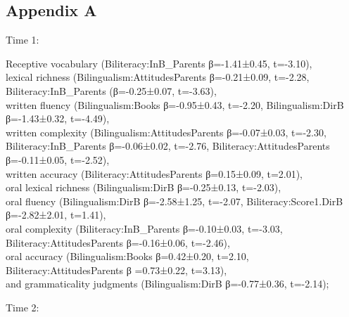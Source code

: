\documentclass[output=paper,modfonts,nonflat,newtxmath]{langsci/langscibook}
\begin{document}
\begin{paperappendix}
\section*{Appendix A}

Time 1:


Receptive vocabulary (Biliteracy:InB\_Parents β=-1.41±0.45, t=-3.10),\\
 lexical richness (Bilingualism:AttitudesParents β=-0.21±0.09, t=-2.28, Biliteracy:InB\_Parents (β=-0.25±0.07, t=-3.63),\\
 written fluency (Bilingualism:Books β=-0.95±0.43, t=-2.20, Bilingualism:DirB β=-1.43±0.32, t=-4.49),\\
 written complexity (Bilingualism:AttitudesParents β=-0.07±0.03, t=-2.30, Biliteracy:InB\_Parents β=-0.06±0.02, t=-2.76, Biliteracy:AttitudesParents β=-0.11±0.05, t=-2.52),\\
 written accuracy (Biliteracy:AttitudesParents β=0.15±0.09, t=2.01),\\
 oral lexical richness (Bilingualism:DirB β=-0.25±0.13, t=-2.03),\\
 oral fluency (Bilingualism:DirB β=-2.58±1.25, t=-2.07, Biliteracy:Score1.DirB β=-2.82±2.01, t=1.41),\\
 oral complexity (Biliteracy:InB\_Parents β=-0.10±0.03, t=-3.03, Biliteracy:AttitudesParents β=-0.16±0.06, t=-2.46),\\
 oral accuracy (Bilingualism:Books β=0.42±0.20, t=2.10, Biliteracy:AttitudesParents β =0.73±0.22, t=3.13),\\
 and grammaticality judgments (Bilingualism:DirB β=-0.77±0.36, t=-2.14);


Time 2:



\end{paperappendix}
\end{document}
